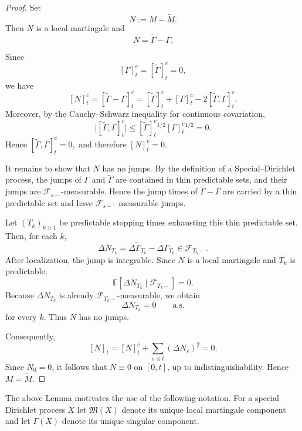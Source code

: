 \documentclass[a4paper,10pt]{article}
\begin{document}
\begin{proof}
Set
\[
        N:=M-\widetilde M .
\]
Then \(N\) is a local martingale and
\[
        N=\widetilde\Gamma-\Gamma .
\]

Since
\[
        [\Gamma]^c_t=[\widetilde\Gamma]^c_t=0,
\]
we have
\[
        [N]^c_t
        =
        [\widetilde\Gamma-\Gamma]^c_t
        =
        [\widetilde\Gamma]^c_t
        +
        [\Gamma]^c_t
        -
        2[\widetilde\Gamma,\Gamma]^c_t.
\]
Moreover, by the Cauchy--Schwarz inequality for continuous
covariation,
\[
        \bigl|[\widetilde\Gamma,\Gamma]^c_t\bigr|
        \le
        [\widetilde\Gamma]^c_t{}^{1/2}
        [\Gamma]^c_t{}^{1/2}
        =
        0.
\]
Hence
$
        [\widetilde\Gamma,\Gamma]^c_t=0,
$
and therefore
$
        [N]^c_t=0.
$

It remains to show that \(N\) has no jumps. By the definition of a
Special--Dirichlet process, the jumps of \(\Gamma\) and
\(\widetilde\Gamma\) are contained in thin predictable sets, and their jumps are \(\mathcal F_{s-}\)-measurable. Hence the jump times of
$
        \widetilde\Gamma-\Gamma
$
are carried by a thin predictable set and have \(\mathcal F_{s-}\)-
measurable jumps.

Let \((T_k)_{k\ge1}\) be predictable stopping times exhausting this thin
predictable set. Then, for each \(k\),
\[
        \Delta N_{T_k}
        =
        \Delta\widetilde\Gamma_{T_k}
        -
        \Delta\Gamma_{T_k}
        \in\mathcal F_{T_k-}.
\]
After localization, the jump is integrable. Since \(N\) is a local
martingale and \(T_k\) is predictable,
\[
        \mathbb E[\Delta N_{T_k}\mid\mathcal F_{T_k-}]=0.
\]
Because \(\Delta N_{T_k}\) is already \(\mathcal F_{T_k-}\)-measurable,
we obtain
\[
        \Delta N_{T_k}=0
        \qquad\text{a.s.}
\]
for every \(k\). Thus \(N\) has no jumps.

Consequently,
\[
        [N]_t=[N]^c_t+\sum_{s\le t}(\Delta N_s)^2=0.
\]
Since \(N_0=0\), it follows that
$
        N\equiv0
$
on \([0,t]\), up to indistinguishability. Hence
$
        M=\widetilde M .
$
\end{proof}


The above Lemma motivates the use of the following notation. For a special Dirichlet process $X$ let $\mathfrak{M}(X)$ denote its unique local martingale component and let $\mathfrak{\Gamma}(X)$ denote its unique singular component.
\end{document}
